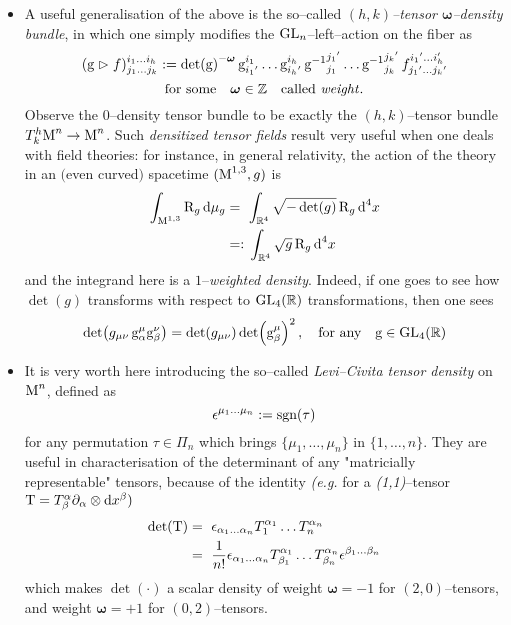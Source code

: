 \begin{example}
\begin{itemize}
        \item A useful generalisation of the above is the so--called \emph{$(h,k)$--tensor $\boldsymbol{\omega}$--density bundle}, in which one simply modifies the $\text{\normalfont GL}_n$--left--action on the fiber as 
        $$(\text{\normalfont g}\vartriangleright f)^{i_1\hdots i_h}_{j_1\hdots j_k}:=\det(\text{\normalfont g})^{-\boldsymbol{\omega}}\,{\text{\normalfont g}}^{i_1}_{{i_1}'}\hdots{\text{\normalfont g}}^{i_h}_{{i_h}'}\,{\text{\normalfont g}^{-1}}^{{j_1}'}_{j_1}\hdots{\text{\normalfont g}^{-1}}^{{j_k}'}_{j_k}\,f^{{i_1}'\hdots{i_h'}}_{{j_1}'\hdots{j_k}'}$$
        $$\text{for some}\quad\boldsymbol{\omega}\in\mathbb{Z}\quad\text{called \emph{weight}}.$$
        Observe the $0$--density tensor bundle to be exactly the $(h,k)$--tensor bundle $T^h_k\text{\normalfont M}^n\to\text{\normalfont M}^n$. Such \emph{densitized tensor fields} result very useful when one deals with field theories: for instance, in general relativity, the action of the theory in an $($even curved$)$ spacetime $(\text{\normalfont M}^{1,3},g)$ is
        \begin{align*}
            \int_{\text{\normalfont M}^{1,3}}\text{\normalfont R}_g\,\text{\normalfont d}\mu_g&=\,\,\int_{\mathbb{R}^4}\sqrt{-\det(g)}\,\text{\normalfont R}_g\,\text{\normalfont d}^4x\\
            &=:\,\int_{\mathbb{R}^4}\sqrt{g}\,\text{\normalfont R}_g\,\text{\normalfont d}^4x
        \end{align*}
    and the integrand here is a $1$--\emph{weighted density}. Indeed, if one goes to see how $\det(g)$ transforms with respect to $\text{\normalfont GL}_4(\mathbb{R})$ transformations, then one sees 
    $$\det(g_{\mu\nu}\,\text{\normalfont g}^\mu_\alpha\text{\normalfont g}^\nu_\beta)=\det(g_{\mu\nu})\det(\text{\normalfont g}^\mu_\beta)^2\,,\quad\text{for any}\quad\text{\normalfont g}\in\text{\normalfont GL}_4(\mathbb{R})$$

\item It is very worth here introducing the so--called \emph{Levi--Civita tensor density} on $\text{\normalfont M}^n$, defined as
$$\epsilon^{\mu_1\hdots\mu_n}:=\text{\normalfont sgn}(\tau)$$
for any permutation $\tau\in\Pi_n$ which brings $\{\mu_1,\hdots,\mu_n\}$ in $\{1,\hdots,n\}$. They are useful in characterisation of the determinant of any "matricially representable" tensors, because of the identity \emph{(e.g.} for a \emph{(1,1)}--tensor $\text{\normalfont T}=T^\alpha_\beta\partial_\alpha\otimes\text{\normalfont d} x^\beta)$ 
\begin{align*}
    \det(\text{\normalfont T})&=\,\,\epsilon_{\alpha_1\hdots\alpha_n}T_1^{\alpha_1}\hdots T^{\alpha_n}_n\\
    &=\,\,\frac{1}{n!}\epsilon_{\alpha_1\hdots\alpha_n}T^{\alpha_1}_{\beta_1}\hdots T^{\alpha_n}_{\beta_n}\epsilon^{\beta_1\hdots\beta_n}
\end{align*}
which makes $\det(\cdot)$ a scalar density of weight $\boldsymbol{\omega}=-1$ for $(2,0)$--tensors, and weight $\boldsymbol{\omega}=+1$ for $(0,2)$--tensors.



\end{itemize}
\end{example}
